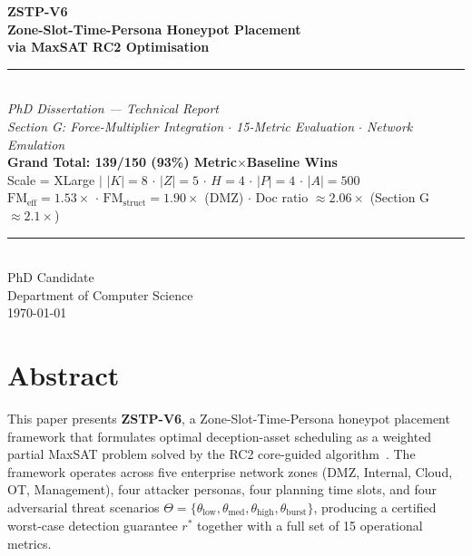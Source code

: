 \documentclass[12pt,a4paper]{article}
\newcommand{\rstar}{r^*}
\newcommand{\FMeff}{\mathrm{FM}_{\mathrm{eff}}}
\newcommand{\FMst}{\mathrm{FM}_{\mathrm{struct}}}
\begin{document}
\begin{titlepage}
\thispagestyle{empty}
\begin{center}
\vspace*{20mm}
{\Huge\bfseries\color{NavyBlue} ZSTP-V6}\\[6pt]
{\LARGE\bfseries\color{NavyBlue} Zone-Slot-Time-Persona Honeypot Placement}\\[4pt]
{\LARGE\bfseries\color{TealDark} via MaxSAT RC2 Optimisation}\\[12pt]
{\color{TealDark}\rule{0.6\linewidth}{1.2pt}}\\[10pt]
{\large\itshape PhD Dissertation — Technical Report}\\[4pt]
{\normalsize\itshape Section G: Force-Multiplier Integration $\cdot$ 15-Metric Evaluation $\cdot$ Network Emulation}\\[16pt]
{\Large\bfseries\color{GreenDark}
  Grand Total: 139/150 (93\%) Metric$\times$Baseline Wins}\\[6pt]
{\normalsize Scale = XLarge $\mid$ $|K|{=}8$ $\cdot$ $|Z|{=}5$ $\cdot$ $H{=}4$ $\cdot$ $|P|{=}4$ $\cdot$ $|A|{=}500$}\\[6pt]
{\normalsize $\FMeff{=}1.53\times$ $\cdot$ $\FMst{=}1.90\times$ (DMZ) $\cdot$ Doc ratio ${\approx}2.06\times$ (Section G ${\approx}2.1\times$)}
\vfill
{\color{GrayMid}\rule{0.5\linewidth}{0.4pt}}\\[6pt]
{\normalsize\color{GrayDark} PhD Candidate}\\[2pt]
{\normalsize\color{GrayDark} Department of Computer Science}\\[2pt]
{\normalsize\color{GrayDark} \today}
\end{center}
\end{titlepage}

\section*{Abstract}

This paper presents \textbf{ZSTP-V6}, a Zone-Slot-Time-Persona honeypot placement framework
that formulates optimal deception-asset scheduling as a weighted partial MaxSAT problem
solved by the RC2 core-guided algorithm~\cite{imms2019rc2}. The framework operates across five
enterprise network zones (DMZ, Internal, Cloud, OT, Management), four attacker personas,
four planning time slots, and four adversarial threat scenarios
$\Theta{=}\{\theta_{\mathrm{low}}, \theta_{\mathrm{med}}, \theta_{\mathrm{high}}, \theta_{\mathrm{burst}}\}$,
producing a certified worst-case detection guarantee $\rstar$ together with a full set of
15 operational metrics.
\end{document}
